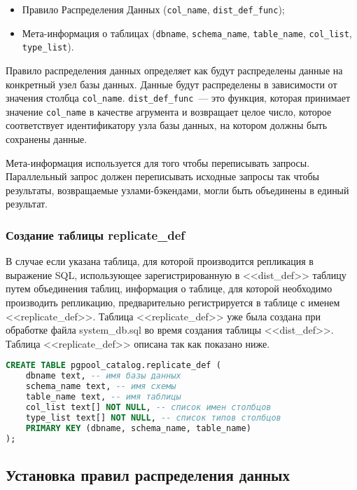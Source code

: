 \begin{itemize}
  \item Правило Распределения Данных (\lstinline!col_name!, \lstinline!dist_def_func!);
  \item Мета-информация о таблицах (\lstinline!dbname!, \lstinline!schema_name!, \lstinline!table_name!, \lstinline!col_list!, \lstinline!type_list!).
\end{itemize}

Правило распределения данных определяет как будут распределены данные на конкретный узел базы данных. Данные будут распределены в зависимости от значения столбца \lstinline!col_name!. \lstinline!dist_def_func!~--- это функция, которая принимает значение \lstinline!col_name! в качестве агрумента и возвращает целое число, которое соответствует идентификатору узла базы данных, на котором должны быть сохранены данные.

Мета-информация используется для того чтобы переписывать запросы. Параллельный запрос должен переписывать исходные запросы так чтобы результаты, возвращаемые узлами-бэкендами, могли быть объединены в единый результат.


\subsubsection{Создание таблицы replicate\_def}

В случае если указана таблица, для которой производится репликация в выражение SQL, использующее зарегистрированную в <<dist\_def>> таблицу путем объединения таблиц, информация о таблице, для которой необходимо производить репликацию, предварительно регистрируется в таблице с именем <<replicate\_def>>. Таблица <<replicate\_def>> уже была создана при обработке файла system\_db.sql во время создания таблицы <<dist\_def>>. Таблица <<replicate\_def>> описана так как показано ниже.

\begin{lstlisting}[language=SQL,label=lst:pgpool31:1,caption=Создание таблицы replicate\_def]
CREATE TABLE pgpool_catalog.replicate_def (
    dbname text, -- имя базы данных
    schema_name text, -- имя схемы
    table_name text, -- имя таблицы
    col_list text[] NOT NULL, -- список имен столбцов
    type_list text[] NOT NULL, -- список типов столбцов
    PRIMARY KEY (dbname, schema_name, table_name)
);
\end{lstlisting}


\subsection{Установка правил распределения данных}
\label{sec:pgpool-II-raspr-data}

